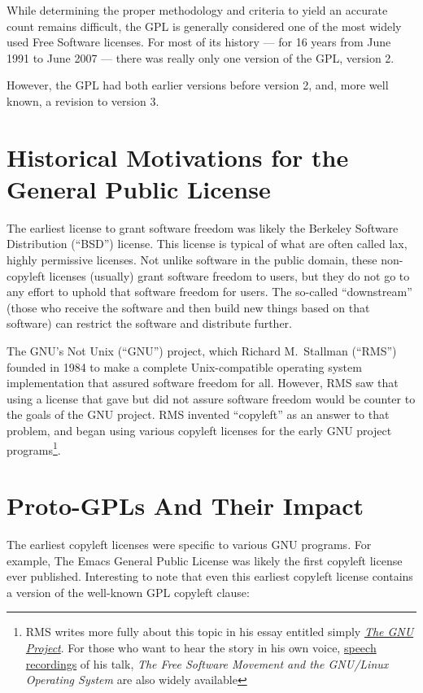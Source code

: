 While determining the proper methodology and criteria to yield an accurate
count remains difficult, the GPL is generally considered one of the most
widely used Free Software licenses.  For most of its history --- for 16 years
from June 1991 to June 2007 --- there was really only one version of the GPL,
version 2.

However, the GPL had both earlier versions before version 2, and, more well
known, a revision to version 3. 

\section{Historical Motivations for the General Public License}

The earliest license to grant software freedom was likely the Berkeley
Software Distribution (``BSD'') license.  This license is typical of what are
often called lax, highly permissive licenses.  Not unlike software in the
public domain, these non-copyleft licenses (usually) grant software freedom
to users, but they do not go to any effort to uphold that software freedom
for users.  The so-called ``downstream'' (those who receive the software and
then build new things based on that software) can restrict the software and
distribute further.

The GNU's Not Unix (``GNU'') project, which Richard M.~Stallman (``RMS'')
founded in 1984 to make a complete Unix-compatible operating system
implementation that assured software freedom for all.  However, RMS saw that
using a license that gave but did not assure software freedom would be
counter to the goals of the GNU project.  RMS invented ``copyleft'' as an
answer to that problem, and began using various copyleft licenses for the
early GNU project programs\footnote{RMS writes more fully about this topic in
  his essay entitled simply
  \href{http://www.gnu.org/gnu/thegnuproject.html}{\textit{The GNU Project}}.
    For those who want to hear the story in his own voice,
    \href{http://audio-video.gnu.org/audio/}{speech recordings} of his talk,
    \textit{The Free Software Movement and the GNU/Linux Operating System}
    are also widely available}.

\section{Proto-GPLs And Their Impact}

The earliest copyleft licenses were specific to various GNU programs.  For
example,  The Emacs
General Public License was likely the first copyleft license ever
published.  Interesting to note that even this earliest copyleft license
contains a version of the well-known GPL copyleft clause:

